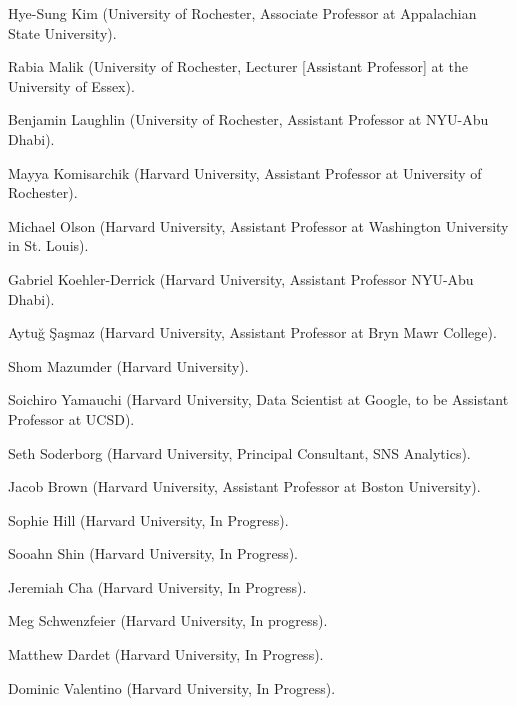 \documentclass[11pt,article,oneside]{memoir}
\begin{document}
\begin{cvlist}
  \begin{cvlist}
\item Hye-Sung Kim (University of Rochester, Associate Professor at Appalachian State University).
\item Rabia Malik (University of Rochester, Lecturer [Assistant Professor] at the University of Essex).
\item Benjamin Laughlin (University of Rochester, Assistant Professor at NYU-Abu Dhabi).
\item Mayya Komisarchik (Harvard University, Assistant Professor at University of Rochester).
\item Michael Olson (Harvard University, Assistant Professor at Washington University in St. Louis).
\item Gabriel Koehler-Derrick (Harvard University, Assistant Professor NYU-Abu Dhabi).
\item Aytu\u{g} \c{S}a\c{s}maz (Harvard University, Assistant Professor at Bryn Mawr College).
\item Shom Mazumder (Harvard University).
\item Soichiro Yamauchi (Harvard University, Data Scientist at Google, to be Assistant Professor at UCSD).
\item Seth Soderborg (Harvard University, Principal Consultant, SNS Analytics).
\item Jacob Brown (Harvard University,  Assistant Professor at Boston University).
\item Sophie Hill (Harvard University, In Progress).
\item Sooahn Shin (Harvard University, In Progress).
\item Jeremiah Cha (Harvard University, In Progress).
\item Meg Schwenzfeier (Harvard University, In progress).
\item Matthew Dardet (Harvard University, In Progress).
\item Dominic Valentino (Harvard University, In Progress). 
\end{cvlist} 


\end{cvlist}
\end{document}
